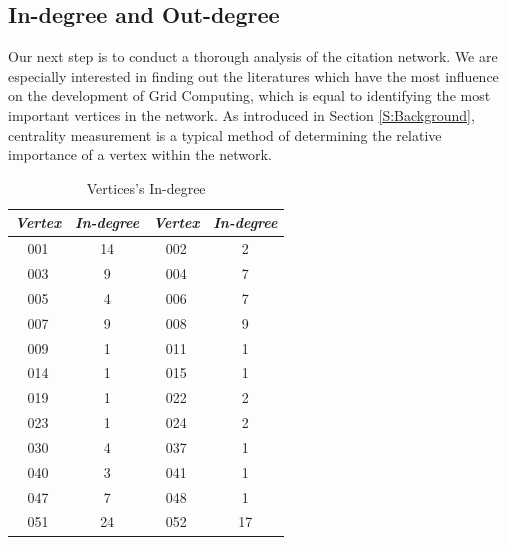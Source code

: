 \subsection{In-degree and Out-degree}

Our next step is to conduct a thorough analysis of the citation network. We are especially interested in finding out the literatures which have the most influence on the development of Grid Computing, which is equal to identifying the most important vertices in the network. As introduced in Section \ref{S:Background}, centrality measurement is a typical method of determining the relative importance of a vertex within the network.  

\begin{table}[htb]
\begin{center}
\begin {tabular} {|c|c|c|c|}
\hline
{\em \bf Vertex} & {\em \bf In-degree}&{\em \bf Vertex } & {\em \bf In-degree}\\
\hline
\hline
001 & 14 &002& 2\\
\hline
003& 9&004& 7 \\
\hline
005 & 4 &006& 7\\
\hline
007& 9&008& 9 \\
\hline
009 & 1 &011& 1\\
\hline
014& 1&015& 1 \\
\hline
019 & 1 &022& 2\\
\hline
023&1&024&2 \\
\hline
030 & 4 &037& 1\\
\hline
040&3&041&1 \\
\hline
047 & 7 &048& 1\\
\hline
051&24&052&17 \\
\hline
\end {tabular}
\caption{Vertices's In-degree}
\label {T:indegree}
\end{center}
\end {table}


